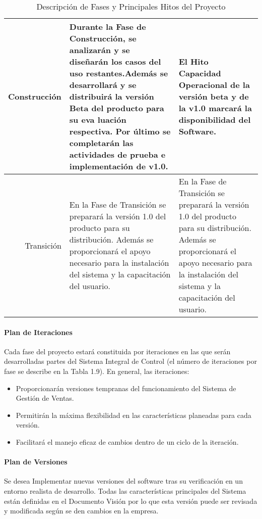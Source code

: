 \documentclass[a4paper,11pt, spanish]{report}
\begin{document}
{{{{{{{{{{\begin{table}[H]
\begin{tabularx}{\textwidth}{r|X|X}
            Construcción & Durante la Fase de Construcción, se analizarán y se diseñarán los casos del uso restantes.Además se desarrollará y se distribuirá la versión Beta del producto para su eva luación respectiva. Por último se completarán las actividades de prueba e implementación de v1.0.  & El Hito Capacidad Operacional de la versión beta y de la v1.0 marcará la disponibilidad del Software. \\ \hline
            Transición & En la Fase de Transición se preparará la versión 1.0 del producto para su distribución. Además se proporcionará el apoyo necesario para la instalación del sistema y la capacitación del usuario. & En la Fase de Transición se preparará la versión 1.0 del producto para su distribución. Además se proporcionará el apoyo necesario para la instalación del sistema y la capacitación del usuario. 
            \end{tabularx}
            \caption{Descripción de Fases y Principales Hitos del Proyecto}
            \end {table}
            
            \paragraph{Plan de Iteraciones}
            
              Cada fase del proyecto estará constituida por iteraciones en las que serán desarrolladas partes del Sistema Integral de Control (el número de iteraciones por fase se describe en la Tabla 1.9). En general, las iteraciones: 
                \begin{itemize}
                \item Proporcionarán versiones tempranas del funcionamiento del Sistema de Gestión de Ventas. 
                \item Permitirán la máxima flexibilidad en las características planeadas para cada versión. 
                \item Facilitará el manejo eficaz de cambios dentro de un ciclo de la iteración.
                \end{itemize}
            \paragraph{Plan de Versiones}
            
            Se desea Implementar nuevas versiones del software tras su verificación en un entorno realista de desarrollo. Todas las características principales del Sistema están definidas en el Documento Visión por lo que esta versión puede ser revisada y modificada según se den cambios en la empresa.
            
}}}}}}}}}}
\end{document}
